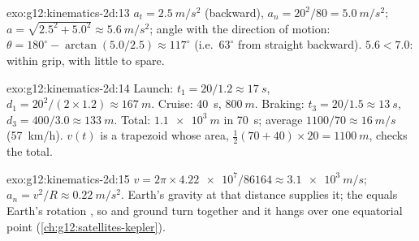 \begin{solution}{exo:g12:kinematics-2d:13}
$a_t = \qty{2.5}{m/s^2}$ (backward), $a_n = 20^2/80 =
\qty{5.0}{m/s^2}$;
$a = \sqrt{2.5^2 + 5.0^2} \approx \qty{5.6}{m/s^2}$; angle with the
direction of motion: $\theta = 180^\circ - \arctan(5.0/2.5) \approx 117^\circ$
(i.e.\ $63^\circ$ from straight backward). $5.6 < 7.0$: within grip,
with little to spare.
\end{solution}

\begin{solution}{exo:g12:kinematics-2d:14}
Launch: $t_1 = 20/1.2 \approx \qty{17}{s}$,
$d_1 = 20^2/(2 \times 1.2) \approx \qty{167}{m}$. Cruise:
\qty{40}{s}, $\qty{800}{m}$. Braking: $t_3 = 20/1.5 \approx
\qty{13}{s}$, $d_3 = 400/3.0 \approx \qty{133}{m}$. Total:
$\qty{1.1e3}{m}$ in \qty{70}{s}; average $1100/70 \approx
\qty{16}{m/s}$ (\qty{57}{km/h}). $v(t)$ is a trapezoid whose area,
$\tfrac12(70 + 40) \times 20 = \qty{1100}{m}$, checks the total.
\end{solution}

\begin{solution}{exo:g12:kinematics-2d:15}
$v = 2\pi \times \num{4.22e7}/\num{86164} \approx \qty{3.1e3}{m/s}$;
$a_n = v^2/R \approx \qty{0.22}{m/s^2}$. Earth's gravity at that
distance supplies it; the  equals Earth's rotation , so
 and ground turn together and it hangs over one equatorial
point (\cref{ch:g12:satellites-kepler}).
\end{solution}

